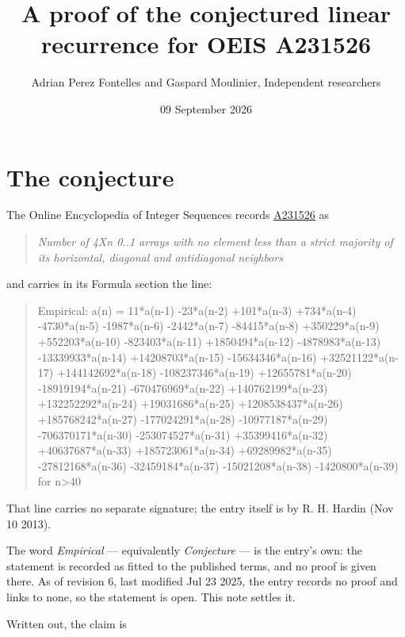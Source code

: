 \documentclass[11pt]{article}
\title{A proof of the conjectured linear recurrence for OEIS A231526}
\author{Adrian Perez Fontelles and Gaspard Moulinier, Independent researchers}
\date{09 September 2026}
\theoremstyle{definition}
\begin{document}
\maketitle
\section{The conjecture}

The Online Encyclopedia of Integer Sequences records \href{https://oeis.org/A231526}{A231526} as

\begin{quote}\itshape Number of 4Xn 0..1 arrays with no element less than a strict majority of its horizontal, diagonal and antidiagonal neighbors\end{quote}

and carries in its Formula section the line:

\begin{quote}\ttfamily Empirical: a(n) = 11*a(n-1) -23*a(n-2) +101*a(n-3) +734*a(n-4) -4730*a(n-5) -1987*a(n-6) -2442*a(n-7) -84415*a(n-8) +350229*a(n-9) +552203*a(n-10) -823403*a(n-11) +1850494*a(n-12) -4878983*a(n-13) -13339933*a(n-14) +14208703*a(n-15) -15634346*a(n-16) +32521122*a(n-17) +144142692*a(n-18) -108237346*a(n-19) +12655781*a(n-20) -18919194*a(n-21) -670476969*a(n-22) +140762199*a(n-23) +132252292*a(n-24) +19031686*a(n-25) +1208538437*a(n-26) +185768242*a(n-27) -177024291*a(n-28) -10977187*a(n-29) -706370171*a(n-30) -253074527*a(n-31) +35399416*a(n-32) +40637687*a(n-33) +185723061*a(n-34) +69289982*a(n-35) -27812168*a(n-36) -32459184*a(n-37) -15021208*a(n-38) -1420800*a(n-39) for n>40\end{quote}

That line carries no separate signature; the entry itself is by R. H. Hardin (Nov 10 2013).

The word {\itshape Empirical} --- equivalently {\itshape Conjecture} --- is the entry's own: the statement is recorded as fitted to the published terms, and no proof is given there. As of revision 6, last modified Jul 23 2025, the entry records no proof and links to none, so the statement is open. This note settles it.

Written out, the claim is
\end{document}
